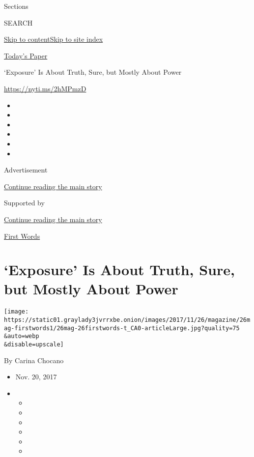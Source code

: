 Sections

SEARCH

\protect\hyperlink{site-content}{Skip to
content}\protect\hyperlink{site-index}{Skip to site index}

\href{https://myaccount.nytimes3xbfgragh.onion/auth/login?response_type=cookie\&client_id=vi}{}

\href{https://www.nytimes3xbfgragh.onion/section/todayspaper}{Today's
Paper}

`Exposure' Is About Truth, Sure, but Mostly About Power

\url{https://nyti.ms/2hMPmzD}

\begin{itemize}
\item
\item
\item
\item
\item
\item
\end{itemize}

Advertisement

\protect\hyperlink{after-top}{Continue reading the main story}

Supported by

\protect\hyperlink{after-sponsor}{Continue reading the main story}

\href{/column/first-words}{First Words}

\hypertarget{exposure-is-about-truth-sure-but-mostly-about-power}{%
\section{`Exposure' Is About Truth, Sure, but Mostly About
Power}\label{exposure-is-about-truth-sure-but-mostly-about-power}}

\texttt{[image: https://static01.graylady3jvrrxbe.onion/images/2017/11/26/magazine/26mag-firstwords1/26mag-26firstwords-t\_CA0-articleLarge.jpg?quality=75\\\&auto=webp\\\&disable=upscale]}

By Carina Chocano

\begin{itemize}
\item
  Nov. 20, 2017
\item
  \begin{itemize}
  \item
  \item
  \item
  \item
  \item
  \item
  \end{itemize}
\end{itemize}

